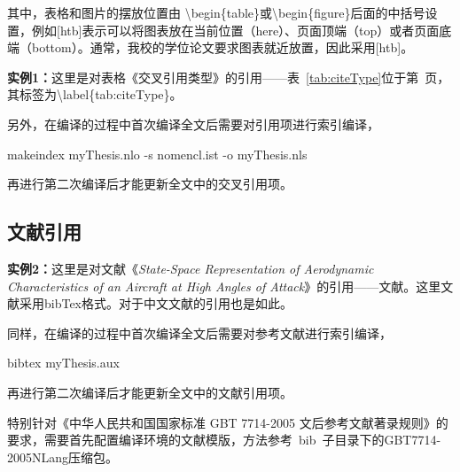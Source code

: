 其中，表格和图片的摆放位置由 \textbackslash begin\{table\}或\textbackslash begin\{figure\}后面的中括号设置，例如[htb]表示可以将图表放在当前位置（here）、页面顶端（top）或者页面底端（bottom）。通常，我校的学位论文要求图表就近放置，因此采用[htb]。

{\bf{实例1：}}这里是对表格《交叉引用类型》的引用——表~\ref{tab:citeType}位于第~\pageref{tab:citeType}页，其标签为\textbackslash label\{tab:citeType\}。

另外，在编译的过程中首次编译全文后需要对引用项进行索引编译，

\begin{center}
  {\color{blue}makeindex myThesis.nlo -s nomencl.ist -o myThesis.nls}
\end{center}

再进行第二次编译后才能更新全文中的交叉引用项。

\subsection{文献引用}
\label{sec:citeRefs}

{\bf{实例2：}}这里是对文献《{\it{State-Space Representation of Aerodynamic Characteristics of an Aircraft at High Angles of Attack}}》的引用——文献\cite{Goman:state_aerodynamics}。这里文献采用bibTex格式。对于中文文献的引用也是如此\cite{BUAA:2002-CFD-missile}。

同样，在编译的过程中首次编译全文后需要对参考文献进行索引编译，

\begin{center}
  {\color{blue}bibtex myThesis.aux}
\end{center}

再进行第二次编译后才能更新全文中的文献引用项。

特别针对《中华人民共和国国家标准 GBT 7714-2005 文后参考文献著录规则》的要求，需要首先配置编译环境的文献模版，方法参考~bib~子目录下的GBT7714-2005NLang压缩包。
